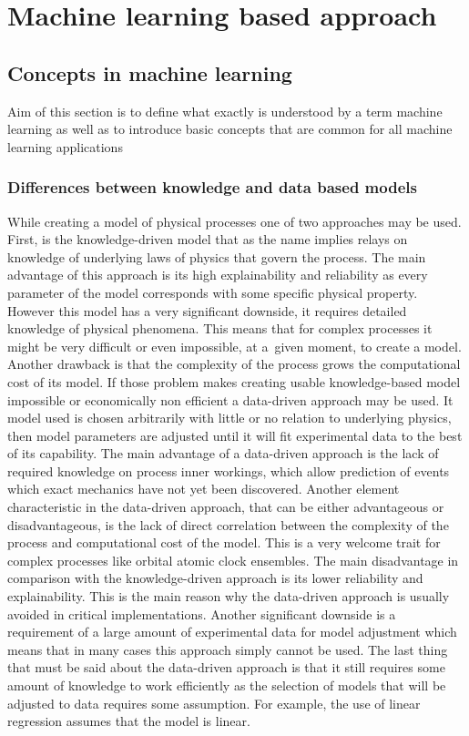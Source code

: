\chapter{Machine learning based approach}


\section{Concepts in machine learning}
Aim of this section is to define what exactly is understood by a term machine learning as well
as to introduce basic concepts that are common for all machine learning applications

\subsection{Differences between knowledge and data based models}
While creating a model of physical processes one of two approaches may be used.
First, is the knowledge-driven model that as the name implies relays on knowledge of underlying
laws of physics that govern the process.
The main advantage of this approach is its high explainability and reliability as every parameter
of the model corresponds with some specific physical property.
However this model has a very significant downside, it requires detailed knowledge of physical
phenomena. This means that for complex processes it might be very difficult or even
impossible, at a~given moment, to create a model. Another drawback is that the complexity of
the process grows the computational cost of its model.
If those problem makes creating usable knowledge-based model impossible or economically
non efficient a data-driven approach may be used.
It model used is chosen arbitrarily with little or no relation to underlying physics,
then model parameters are adjusted until it will fit experimental data to the best of its
capability.
The main advantage of a data-driven approach is the lack of required knowledge on process 
inner workings, which allow prediction of events which exact mechanics have not 
yet been discovered.
Another element characteristic in the data-driven approach, that can be either advantageous or
disadvantageous, is the lack of direct correlation between the complexity 
of the process and computational cost of the model.
This is a very welcome trait for complex processes like orbital atomic clock ensembles.
The main disadvantage in comparison with the knowledge-driven approach is its lower reliability and
explainability. This is the main reason why the data-driven approach is usually avoided in
critical implementations. Another significant downside is a requirement of a large amount of
experimental data for model adjustment which means that in many cases this approach simply
cannot be used.
The last thing that must be said about the data-driven approach is that it still requires some
amount of knowledge to work efficiently as the selection of models that will be adjusted to
data requires some assumption. For example, the use of linear regression assumes that the model
is linear.


